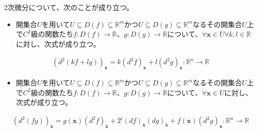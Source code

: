 \documentclass[dvipdfmx]{jsarticle}
\begin{document}
\begin{thm}\label{4.2.7.10} 2次微分について、次のことが成り立つ。
\begin{itemize}
\item
  開集合$U$を用いて$U \subseteq D(f) \subseteq \mathbb{R}^{m}$かつ$U \subseteq D(g) \subseteq \mathbb{R}^{m}$なるその開集合$U$上で$C^{2}$級の関数たち$f:D(f) \rightarrow \mathbb{R}$、$g:D(g) \rightarrow \mathbb{R}$について、$\forall\mathbf{x} \in U\forall k,l \in \mathbb{R}$に対し、次式が成り立つ。
\end{itemize}
\begin{align*}
\left( d^{2}(kf + lg) \right)_{\mathbf{x}} = k\left( d^{2}f \right)_{\mathbf{x}} + l\left( d^{2}g \right)_{\mathbf{x}}:\mathbb{R}^{n} \rightarrow \mathbb{R}
\end{align*}
\begin{itemize}
\item
  開集合$U$を用いて$U \subseteq D(f) \subseteq \mathbb{R}^{m}$かつ$U \subseteq D(g) \subseteq \mathbb{R}^{m}$なるその開集合$U$上で$C^{2}$級の関数たち$f:D(f) \rightarrow \mathbb{R}$、$g:D(g) \rightarrow \mathbb{R}$について、$\forall\mathbf{x} \in U$に対し、次式が成り立つ。
\end{itemize}
\begin{align*}
\left( d^{2}(fg) \right)_{\mathbf{x}} = g\left( \mathbf{x} \right)\left( d^{2}f \right)_{\mathbf{x}} + 2{}^{t}(df)_{\mathbf{x}}(dg)_{\mathbf{x}} + f\left( \mathbf{x} \right)\left( d^{2}g \right)_{\mathbf{x}}:\mathbb{R}^{n} \rightarrow \mathbb{R}
\end{align*}
\end{thm}
\end{document}

